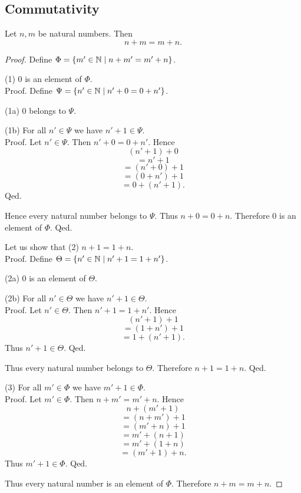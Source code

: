 \documentclass[../arithmetic.tex]{subfiles}
\begin{document}
  \subsection*{Commutativity}

  \begin{forthel}
    \begin{proposition}
      Let $n, m$ be natural numbers.
      Then \[ n \plus m = m \plus n. \]
    \end{proposition}
    \begin{proof}
      Define $\Phi = \{ m' \in \mathbb{N} \mid n + m' = m' + n \}$.

      (1) $0$ is an element of $\Phi$. \\
      Proof.
        Define $\Psi = \{ n' \in \mathbb{N} \mid n' + 0 = 0 + n' \}$.

        (1a) $0$ belongs to $\Psi$.

        (1b) For all $n' \in \Psi$ we have $n' \plus 1 \in \Psi$. \\
        Proof.
          Let $n' \in \Psi$.
          Then $n' \plus 0 = 0 \plus n'$.
          Hence
          \[  (n' \plus 1) \plus 0        \]
          \[    = n' \plus 1          \]
          \[    = (n' \plus 0) \plus 1    \]
          \[    = (0 \plus n') \plus 1    \]
          \[    = 0 \plus (n' \plus 1).   \]
        Qed.

        Hence every natural number belongs to $\Psi$.
        Thus $n \plus 0 = 0 \plus n$.
        Therefore $0$ is an element of $\Phi$.
      Qed.

      Let us show that (2) $n \plus 1 = 1 \plus n$. \\
      Proof.
        Define $\Theta = \{ n' \in \mathbb{N} \mid n' + 1 = 1 + n' \}$.

        (2a) $0$ is an element of $\Theta$.

        (2b) For all $n' \in \Theta$ we have $n' \plus 1 \in \Theta$. \\
        Proof.
          Let $n' \in \Theta$.
          Then $n' \plus 1 = 1 \plus n'$.
          Hence
          \[  (n' \plus 1) \plus 1        \]
          \[    = (1 \plus n') \plus 1    \]
          \[    = 1 \plus (n' \plus 1).   \]
          Thus $n' \plus 1 \in \Theta$.
        Qed.

        Thus every natural number belongs to $\Theta$.
        Therefore $n \plus 1 = 1 \plus n$.
      Qed.

      (3) For all $m' \in \Phi$ we have $m' \plus 1 \in \Phi$. \\
      Proof.
        Let $m' \in \Phi$.
        Then $n \plus m' = m' \plus n$.
        Hence
        \[  n \plus (m'  \plus 1)       \]
        \[    = (n \plus m') \plus 1    \]
        \[    = (m' \plus n) \plus 1    \]
        \[    = m' \plus (n \plus 1)    \]
        \[    = m' \plus (1 \plus n)    \]
        \[    = (m' \plus 1) \plus n.   \]
        Thus $m' \plus 1 \in \Phi$.
      Qed.

      Thus every natural number is an element of $\Phi$.
      Therefore $n \plus m = m \plus n$.
    \end{proof}
  \end{forthel}
\end{document}
